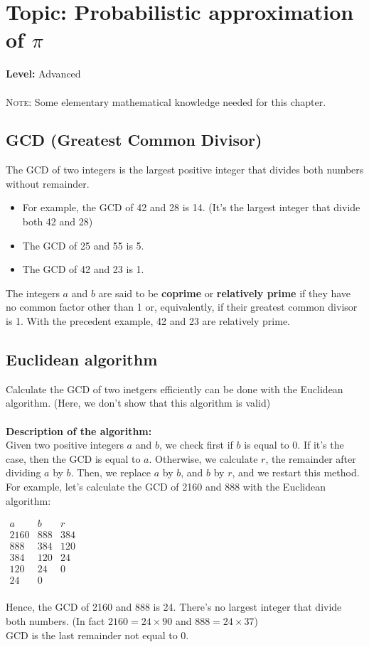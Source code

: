 \chapter{Topic: Probabilistic approximation of $\pi$}
{ }\hfill\textbf{Level:} Advanced\\ \\
\noindent \textsc{Note:} Some elementary mathematical knowledge needed for this chapter.
\section{GCD (Greatest Common Divisor)}
\noindent 
The GCD of two integers is the largest positive integer that divides both numbers without remainder.
\begin{itemize}
\item For example, the GCD of 42 and 28 is 14. (It's the largest integer that divide both 42 and 28)
\item The GCD of 25 and 55 is 5.
\item The GCD of 42 and 23 is 1.
\end{itemize}
The integers $a$ and $b$ are said to be \textbf{coprime} or \textbf{relatively prime} if they have no common factor other than 1 or, equivalently, if their greatest common divisor is 1.
With the precedent example, 42 and 23 are relatively prime.
\section{Euclidean algorithm}
\noindent Calculate the GCD of two inetgers efficiently can be done with the Euclidean algorithm. (Here, we don't show that this algorithm is valid)\\ \\
\textbf{Description of the algorithm:}\\
Given two positive integers $a$ and $b$, we check first if $b$ is equal to 0. If it's the case, then the GCD is equal to $a$. Otherwise, we calculate $r$, the remainder after dividing $a$ by $b$. Then, we replace $a$ by $b$, and $b$ by $r$, and we restart this method. \\
For example, let's calculate the GCD of 2160 and 888  with the Euclidean algorithm:
\begin{center}
$\begin{array}{ccc}
a & b & r\\
2160 & 888 & 384 \\
888 & 384 & 120 \\
384 & 120 & 24 \\
120 & 24 & 0 \\
24 & 0 & \\
\end{array}$
\end{center}
Hence, the GCD of 2160 and 888 is 24. There's no largest integer that divide both numbers.
(In fact $2160=24\times90$ and $888=24\times37$)\\
GCD is the last remainder not equal to 0.
